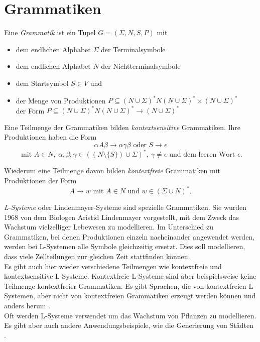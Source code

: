 \section{Grammatiken}
\label{grammars}

Eine \emph{Grammatik} ist ein Tupel $G = (\Sigma, N, S, P)$ mit 
\begin{itemize}
 \item dem endlichen Alphabet $\Sigma$ der Terminalsymbole
 \item dem endlichen Alphabet $N$ der Nichtterminalsymbole
 \item dem Startsymbol $S \in V$ und
 \item der Menge von Produktionen $P \subseteq (N \cup \Sigma)^* N (N \cup \Sigma)^* \times (N \cup \Sigma)^*$\\ der Form $P \subseteq (N \cup \Sigma)^* N (N \cup \Sigma)^* \rightarrow (N \cup \Sigma)^*$
\end{itemize}

Eine Teilmenge der Grammatiken bilden \emph{kontextsensitive} Grammatiken. Ihre Produktionen haben die Form
\[\alpha A \beta \rightarrow \alpha \gamma \beta \text{ oder } S \rightarrow \epsilon\] \[\text{ mit } A \in N,~ \alpha, \beta, \gamma \in ((N \setminus \{ S \}) \cup \Sigma)^*,~ \gamma \neq \epsilon \text{ und dem leeren Wort } \epsilon.\]

Wiederum eine Teilmenge davon bilden \emph{kontextfreie} Grammatiken mit Produktionen der Form 
\[A \rightarrow w \text{ mit } A \in N \text{ und } w \in (\Sigma \cup N)^*.\] \cite[Abschnitte 1.4 und 1.5]{FormalLanguageTheory}

\emph{L-Systeme} oder Lindenmayer-Systeme sind spezielle Grammatiken. Sie wurden 1968 von dem Biologen Aristid Lindenmayer vorgestellt, mit dem Zweck das Wachstum vielzelliger Lebewesen zu modellieren. Im Unterschied zu Grammatiken, bei denen Produktionen einzeln nacheinander angewendet werden, werden bei L-Systemen alle Symbole gleichzeitig ersetzt. Dies soll modellieren, dass viele Zellteilungen zur gleichen Zeit stattfinden können.\\
Es gibt auch hier wieder verschiedene Teilmengen wie \zb kontextfreie und kontextsensitive L-Systeme. Kontextfreie L-Systeme sind aber beispielsweise keine Teilmenge kontextfreier Grammatiken. Es gibt Sprachen, die von kontextfreien L-Systemen, aber nicht von kontextfreien Grammatiken erzeugt werden können und anders herum \cite[Abbildung 1.2]{AlgorithmicBeautyOfPlants}.\\
Oft werden L-Systeme verwendet um das Wachstum von Pflanzen zu modellieren. Es gibt aber auch andere Anwendungsbeispiele, wie \zb die Generierung von Städten \cite{cityGeneration}. 

